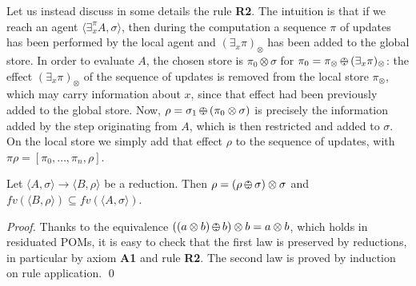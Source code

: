 \documentclass{llncs}
\def\odiv{\, {\ominus\hspace{-7.7pt} \div} \,}
\begin{document}
Let us instead discuss in some details the rule {\bf R2}.
The intuition is that if we reach an agent $\langle \exists^{\pi}_x A,\sigma\rangle$, then during the computation
a sequence $\pi$ of updates has been performed by the local agent and $(\exists_x \pi)_\otimes$ 
has been added to the global store. In order to evaluate $A$, the chosen 
store is 
$\pi_0 \otimes \sigma$ for $\pi_0 = \pi_\otimes \odiv (\exists_x \pi)_\otimes$: the
effect $(\exists_x \pi)_\otimes$ of the sequence of updates is removed from the local store $\pi_\otimes$,
which may carry information about $x$, since that effect had been previously added to the global store.
%
Now, $\rho = \sigma_1 \odiv (\pi_0 \otimes \sigma)$ 
is precisely the information added by the step originating from $A$, which is then restricted and added to $\sigma$. 
On the local store we simply add that effect $\rho$ to the sequence of updates, with
$\pi \rho = [\pi_0, \ldots, \pi_n, \rho]$.

\begin{lemma}[On monotonicity]
\label{rmono}
Let $\langle A, \sigma \rangle \rightarrow \langle B, \rho \rangle$ be a reduction. 
Then $\rho = (\rho \odiv \sigma) \otimes \sigma$ and $fv(\langle B, \rho \rangle) \subseteq fv(\langle A, \sigma \rangle)$.
\end{lemma}
 

\begin{proof}
Thanks to the equivalence $((a \otimes b) \odiv b) \otimes b = a \otimes b$, which holds in residuated POMs,
it is easy to check that the first law is preserved by reductions,
in particular by axiom \mbox{\bf A1} and rule \mbox{\bf R2}.
The second law is proved by induction on rule application.
\qed
\end{proof}
\end{document}
